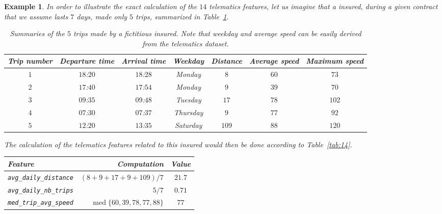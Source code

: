 \documentclass{article}
\DeclareMathOperator*{\mediane}{med}
\newtheorem{Example}{Example}
\begin{document}
\begin{Example}
	In order to illustrate the exact calculation of the $14$ telematics features, let us imagine that a insured, during a given contract that we assume lasts $7$ days, made only $5$ trips, summarized in Table~\ref{tab:ass_fictif}.
    \begin{table}[ht]
        \centering
        \begin{adjustbox}{max width = \textwidth}
            \begin{tabular}{c c c c c c c}
                \toprule 
                \textbf{Trip number} & \textbf{Departure time} & \textbf{Arrival time} & \textbf{Weekday} & \textbf{Distance} & \textbf{Average speed} & \textbf{Maximum speed}\\ 
                \midrule
                $1$ & $18$:$20$ & $18$:$28$ & Monday & $8$ & $60$ & $73$\\
                $2$ & $17$:$40$ & $17$:$54$ & Monday & $9$ & $39$ & $70$\\
                $3$ & $09$:$35$ & $09$:$48$ & Tuesday & $17$ & $78$ & $102$\\
                $4$ & $07$:$30$ & $07$:$37$ & Thursday & $9$ & $77$ & $92$\\
                $5$ & $12$:$20$ & $13$:$35$ & Saturday & $109$ & $88$ & $120$\\
                \bottomrule 
            \end{tabular}
        \end{adjustbox}
        \caption{Summaries of the $5$ trips made by a fictitious insured. Note that weekday and average speed can be easily derived from the telematics dataset.} 
        \label{tab:ass_fictif} 
    \end{table}
    The calculation of the telematics features related to this insured would then be done according to Table~\ref{tab:14}.
    \begin{table}[ht]
        \centering
        \begin{adjustbox}{width = 0.8\textwidth}
            \begin{tabular}{l r c}
                \toprule 
                \textbf{Feature} & \textbf{Computation} & \textbf{Value}\\
                \midrule
                \texttt{avg\_daily\_distance} & $(8 + 9 + 17 + 9 + 109)/7$ & $21.7$\\ 
                \texttt{avg\_daily\_nb\_trips} & $5/7$ & $0.71$\\
                \texttt{med\_trip\_avg\_speed} & $\mediane\{60, 39, 78, 77, 88\}$ & $77$\\

\end{tabular}
\end{adjustbox}
\end{table}
\end{Example}
\end{document}
